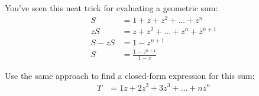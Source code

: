 


\begin{problem}
You've seen this neat trick for evaluating a geometric sum:
%
\begin{align*}
S & = 1 + z + z^2 + \ldots + z^n \\
zS & = z + z^2 + \ldots + z^n + z^{n+1} \\
S - z S & = 1 - z^{n+1} \\
S & = \frac{1-z^{n+1}}{1 - z}
\end{align*}

Use the same approach to find a closed-form expression for this sum:
%
\begin{align*}
T & = 1 z + 2 z^2 + 3 z^3 + \ldots + n z^n
\end{align*}
\end{problem}



